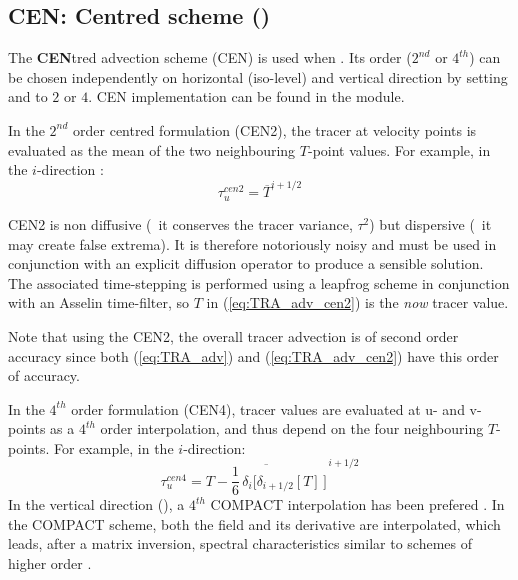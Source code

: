 \documentclass[../main/NEMO_manual]{subfiles}
\begin{document}
\subsection[CEN: Centred scheme (\forcode{ln_traadv_cen})]{CEN: Centred scheme (\protect{})}
\label{subsec:TRA_adv_cen}


The \textbf{CEN}tred advection scheme (CEN) is used when .
Its order ($2^{nd}$ or $4^{th}$) can be chosen independently on
horizontal (iso-level) and vertical direction by
setting  and  to $2$ or $4$.
CEN implementation can be found in the  module.

In the $2^{nd}$ order centred formulation (CEN2), the tracer at velocity points is evaluated as
the mean of the two neighbouring $T$-point values.
For example, in the $i$-direction :
\begin{equation}
  \label{eq:TRA_adv_cen2}
  \tau_u^{cen2} = \overline T ^{i + 1/2}
\end{equation}

CEN2 is non diffusive (\ie\ it conserves the tracer variance, $\tau^2$) but
dispersive (\ie\ it may create false extrema).
It is therefore notoriously noisy and must be used in conjunction with
an explicit diffusion operator to produce a sensible solution.
The associated time-stepping is performed using
a leapfrog scheme in conjunction with an Asselin time-filter,
so $T$ in (\autoref{eq:TRA_adv_cen2}) is the \textit{now} tracer value.

Note that using the CEN2, the overall tracer advection is of second order accuracy since
both (\autoref{eq:TRA_adv}) and (\autoref{eq:TRA_adv_cen2}) have this order of accuracy.


In the $4^{th}$ order formulation (CEN4),
tracer values are evaluated at u- and v-points as a $4^{th}$ order interpolation,
and thus depend on the four neighbouring $T$-points.
For example, in the $i$-direction:
\begin{equation}
  \label{eq:TRA_adv_cen4}
  \tau_u^{cen4} = \overline{T - \frac{1}{6} \, \delta_i \Big[ \delta_{i + 1/2}[T] \, \Big]}^{\,i + 1/2}
\end{equation}
In the vertical direction (),
a $4^{th}$ COMPACT interpolation has been prefered \citep{demange_phd14}.
In the COMPACT scheme, both the field and its derivative are interpolated,
which leads, after a matrix inversion, spectral characteristics similar to schemes of higher order
\citep{lele_JCP92}.
\end{document}
